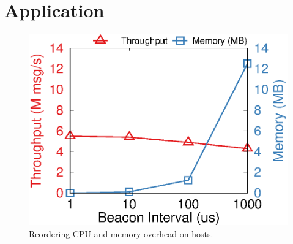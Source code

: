 \section{Application}
\label{sec:application}


\begin{figure}[t!]
	\begin{minipage}{.31\textwidth}
    	\centering
		\includegraphics[width=\textwidth]{gnuplot/reorder_receiver.eps}
		\caption{Reordering CPU and memory overhead on hosts.}
		\label{fig:reorder-overhead}


\end{minipage}
\end{figure}
